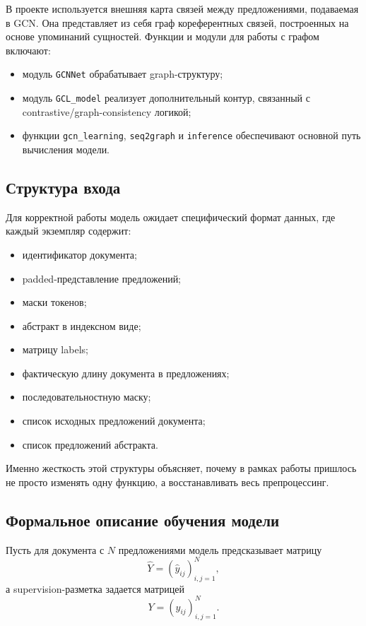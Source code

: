\documentclass[12pt,a4paper]{article}
\begin{document}
В проекте используется внешняя карта связей между предложениями, подаваемая в GCN. 
Она представляет из себя граф кореферентных связей, построенных на основе упоминаний сущностей.
Функции и модули для работы с графом включают:

\begin{itemize}
    \item модуль \texttt{GCNNet} обрабатывает graph-структуру;
    \item модуль \texttt{GCL\_model} реализует дополнительный контур, связанный с
    contrastive/graph-consistency логикой;
    \item функции \texttt{gcn\_learning}, \texttt{seq2graph} и \texttt{inference}
    обеспечивают основной путь вычисления модели.
\end{itemize}

\subsection{Структура входа}

Для корректной работы модель ожидает специфический формат данных, где каждый экземпляр
содержит:

\begin{itemize}
    \item идентификатор документа;
    \item padded-представление предложений;
    \item маски токенов;
    \item абстракт в индексном виде;
    \item матрицу labels;
    \item фактическую длину документа в предложениях;
    \item последовательностную маску;
    \item список исходных предложений документа;
    \item список предложений абстракта.
\end{itemize}

Именно жесткость этой структуры объясняет, почему в рамках работы пришлось не просто
изменять одну функцию, а восстанавливать весь препроцессинг.

\subsection{Формальное описание обучения модели}

Пусть для документа с $N$ предложениями модель предсказывает матрицу
\[
\hat{Y} = (\hat{y}_{ij})_{i,j=1}^{N},
\]
а supervision-разметка задается матрицей
\[
Y = (y_{ij})_{i,j=1}^{N}.
\]
\end{document}
